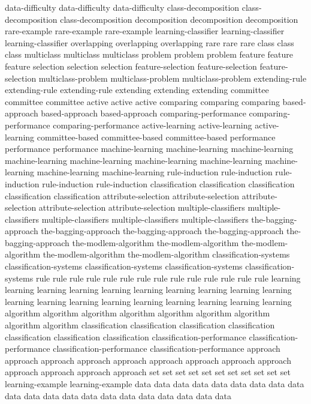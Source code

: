 data-difficulty	data-difficulty	data-difficulty	
class-decomposition	class-decomposition	class-decomposition	
decomposition	decomposition	decomposition	
rare-example	rare-example	rare-example	
learning-classifier	learning-classifier	learning-classifier	
overlapping	overlapping	overlapping	
rare	rare	rare	
class	class	class	
multiclass	multiclass	multiclass	
problem	problem	problem	
feature	feature	feature	
selection	selection	selection	
feature-selection	feature-selection	feature-selection	
multiclass-problem	multiclass-problem	multiclass-problem	
extending-rule	extending-rule	extending-rule	
extending	extending	extending	
committee	committee	committee	
active	active	active	
comparing	comparing	comparing	
based-approach	based-approach	based-approach	
comparing-performance	comparing-performance	comparing-performance	
active-learning	active-learning	active-learning	
committee-based	committee-based	committee-based	
performance	performance	performance	
machine-learning	machine-learning	machine-learning	machine-learning	machine-learning	machine-learning	machine-learning	machine-learning	machine-learning	machine-learning	
rule-induction	rule-induction	rule-induction	rule-induction	rule-induction	
classification	classification	classification	classification	classification	
attribute-selection	attribute-selection	attribute-selection	attribute-selection	attribute-selection	
multiple-classifiers	multiple-classifiers	multiple-classifiers	multiple-classifiers	multiple-classifiers	
the-bagging-approach	the-bagging-approach	the-bagging-approach	the-bagging-approach	the-bagging-approach	
the-modlem-algorithm	the-modlem-algorithm	the-modlem-algorithm	the-modlem-algorithm	the-modlem-algorithm	
classification-systems	classification-systems	classification-systems	classification-systems	classification-systems	
rule	rule	rule	rule	rule	rule	rule	rule	rule	rule	rule	rule	rule	rule	
learning	learning	learning	learning	learning	learning	learning	learning	learning	learning	learning	learning	learning	learning	learning	learning	learning	learning	learning	
algorithm	algorithm	algorithm	algorithm	algorithm	algorithm	algorithm	algorithm	algorithm	
classification	classification	classification	classification	classification	classification	classification	
classification-performance	classification-performance	classification-performance	classification-performance	
approach	approach	approach	approach	approach	approach	approach	approach	approach	approach	approach	approach	approach	
set	set	set	set	set	set	set	set	set	set	set	
learning-example	learning-example	
data	data	data	data	data	data	data	data	data	data	data	data	data	data	data	data	data	data	data	data	data	
